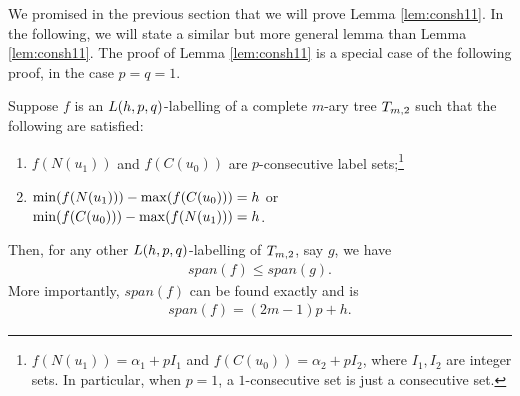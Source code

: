 We promised in the previous section that we will prove Lemma \ref{lem:consh11}. In the following, we will state a similar but more general lemma than Lemma \ref{lem:consh11}. The proof of Lemma \ref{lem:consh11} is a special case of the following proof, in the case $p =q=1$. 



\begin{lemma}
\label{lem:conshpq} Suppose $f$ is an $L(h,p,q)$-labelling of a complete $m$-ary tree $\tm2$ such that the following are satisfied: 

\begin{enumerate}[(1)]
\item $f(N(u_1))$ and $f(C(u_0))$ are $p$-consecutive label sets;\footnote{$f(N(u_1)) = \alpha_1 + pI_1$ and $f(C(u_0)) = \alpha_2 + pI_2$, where $I_1, I_2$ are integer sets. In particular, when $p = 1$, a $1$-consecutive set is just a consecutive set.} 
\item $\min (f(N(u_1))) - \max(f(C(u_0))) = h$ or $\min(f(C(u_0))) - \max(f(N(u_1))) = h$. 
\end{enumerate}
Then, for any other $L(h,p,q)$-labelling of $\tm2$, say $g$, we have 
\begin{align}
\label{minimumhpq}
span(f) \le span(g). 
\end{align}
More importantly, $span(f)$ can be found exactly and is
\begin{align}
\label{exacthpq} 
span(f)= (2m-1)p+h. 
\end{align}
\end{lemma}

